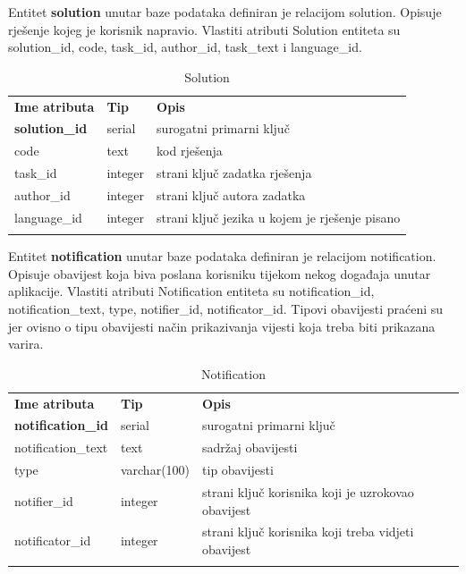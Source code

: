 \documentclass[times, utf8, zavrsni]{fer}
\begin{document}
		Entitet \textbf{solution} unutar baze podataka definiran je relacijom solution. Opisuje rješenje  kojeg je korisnik napravio. Vlastiti atributi Solution entiteta su solution\_id, code, task\_id, author\_id, task\_text i language\_id.
		\begin{table}[H]
			\caption{Solution}
			\label{tbl:solution}
			\centering
			\begin{tabu} to \textwidth {XXX}
				\tabucline[1.75pt]{-}
				\textbf{Ime atributa} & \textbf{Tip} & \textbf{Opis}\\ 				
				\tabucline[1.75pt]{-}
				\textbf{solution\_id} & serial & surogatni primarni ključ\\ \hline
				code & text & kod rješenja\\ \hline
				task\_id & integer & strani ključ zadatka rješenja\\ \hline
				author\_id & integer & strani ključ autora zadatka\\ \hline
				language\_id & integer & strani ključ jezika u kojem je rješenje pisano\\ \hline
				\tabucline[1.75pt]{-}
			\end{tabu}
		\end{table}
	
		Entitet \textbf{notification} unutar baze podataka definiran je relacijom notification. Opisuje obavijest koja biva poslana korisniku tijekom nekog događaja unutar aplikacije. Vlastiti atributi Notification entiteta su notification\_id, notification\_text, type, notifier\_id, notificator\_id. Tipovi obavijesti praćeni su jer ovisno o tipu obavijesti način prikazivanja vijesti koja treba biti prikazana varira.
		\begin{table}[H]
			\caption{Notification}
			\label{tbl:notification}
			\centering
			\begin{tabu} to \textwidth {XXX}
				\tabucline[1.75pt]{-}
				\textbf{Ime atributa} & \textbf{Tip} & \textbf{Opis}\\ 				
				\tabucline[1.75pt]{-}
				\textbf{notification\_id} & serial & surogatni primarni ključ\\ \hline
				notification\_text & text & sadržaj obavijesti\\ \hline
				type & varchar(100) & tip obavijesti\\ \hline
				notifier\_id & integer & strani ključ korisnika koji je uzrokovao obavijest\\ \hline
				notificator\_id & integer & strani ključ korisnika koji treba vidjeti obavijest\\ \hline
				\tabucline[1.75pt]{-}
			\end{tabu}
		\end{table}
	
\end{document}
